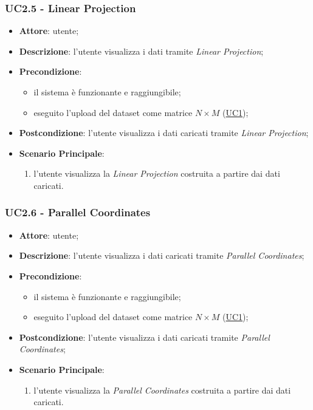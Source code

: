     \subsubsection{UC2.5 - Linear Projection}
    \label{uc2.5}
    
    \begin{itemize}
    \item \textbf{Attore}: utente;
    \item \textbf{Descrizione}: l'utente visualizza i dati tramite \emph{Linear Projection};
    \item \textbf{Precondizione}:
    \begin{itemize}
        \item il sistema è funzionante e raggiungibile;
        \item eseguito l'upload del dataset come matrice $N\times M$ (\hyperref[uc1]{UC1});
    \end{itemize}
    \item \textbf{Postcondizione}: l'utente visualizza i dati caricati tramite \emph{Linear Projection};
    \item \textbf{Scenario Principale}: 
        \begin{enumerate}
            \item l'utente visualizza la \emph{Linear Projection} costruita a partire dai dati caricati.
        \end{enumerate}
    \end{itemize}
    
    \subsubsection{UC2.6 - Parallel Coordinates}
    \label{uc2.6}
    
    \begin{itemize}
    \item \textbf{Attore}: utente;
    \item \textbf{Descrizione}:  l'utente visualizza i dati caricati tramite \emph{Parallel Coordinates};
    \item \textbf{Precondizione}:
    \begin{itemize}
        \item il sistema è funzionante e raggiungibile;
        \item eseguito l'upload del dataset come matrice $N\times M$ (\hyperref[uc1]{UC1});
    \end{itemize}
    \item \textbf{Postcondizione}: l'utente visualizza i dati caricati tramite \emph{Parallel Coordinates};
    \item \textbf{Scenario Principale}: 
        \begin{enumerate}
            \item l'utente visualizza la \emph{Parallel Coordinates} costruita a partire dai dati caricati.
        \end{enumerate}
    \end{itemize}
    
  
